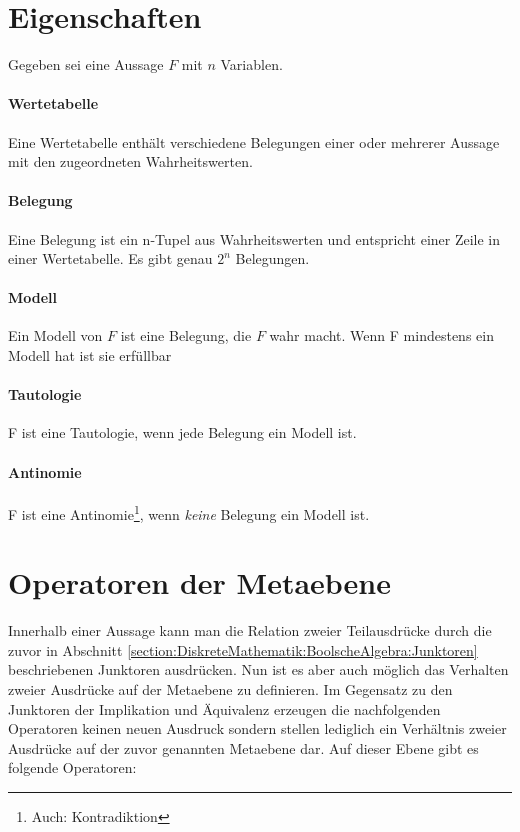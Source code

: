 \documentclass[../main.tex]{subfiles}
\begin{document}
                
    \section{Eigenschaften}
        Gegeben sei eine Aussage $F$ mit $n$ Variablen.
        
        \paragraph{Wertetabelle}
            Eine Wertetabelle enthält verschiedene Belegungen einer oder mehrerer Aussage mit den zugeordneten Wahrheitswerten.
            
        \paragraph{Belegung}
    	    Eine Belegung ist ein n-Tupel aus Wahrheitswerten und entspricht einer Zeile in einer Wertetabelle. Es gibt genau $2^n$ Belegungen.
            
        
        \paragraph{Modell}
            Ein Modell von $F$ ist eine Belegung, die $F$ wahr macht. Wenn F mindestens ein Modell hat ist sie erfüllbar
            
        \paragraph{Tautologie}
            F ist eine Tautologie, wenn jede Belegung ein Modell ist.
            
        \paragraph{Antinomie}
            F ist eine Antinomie\footnote{Auch: Kontradiktion}, wenn \emph{keine} Belegung ein Modell ist.
                
    \section[Metaebene]{Operatoren der Metaebene}
        Innerhalb einer Aussage kann man die Relation zweier Teilausdrücke durch die zuvor in Abschnitt \ref{section:DiskreteMathematik:BoolscheAlgebra:Junktoren} beschriebenen Junktoren ausdrücken. Nun ist es aber auch möglich das Verhalten zweier Ausdrücke auf der Metaebene zu definieren. Im Gegensatz zu den Junktoren der Implikation und Äquivalenz erzeugen die nachfolgenden Operatoren keinen neuen Ausdruck sondern stellen lediglich ein Verhältnis zweier Ausdrücke auf der zuvor genannten Metaebene dar. Auf dieser Ebene gibt es folgende Operatoren:
        
\end{document}
